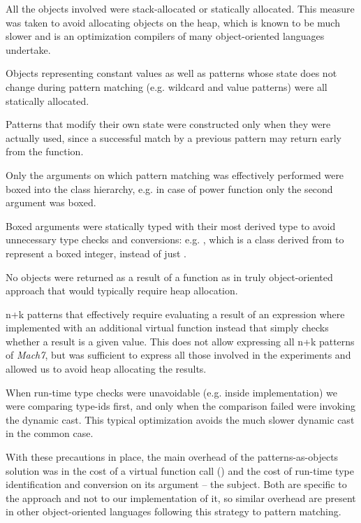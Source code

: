 \begin{compactitem}
\setlength{\itemsep}{0pt}
\setlength{\parskip}{0pt}
\item All the objects involved were stack-allocated or statically allocated. 
      This measure was taken to avoid allocating objects on the heap, which is 
      known to be much slower and is an optimization compilers of many 
      object-oriented languages undertake.
\item Objects representing constant values as well as patterns whose state 
      does not change during pattern matching (e.g. wildcard and value patterns) 
      were all statically allocated.
\item Patterns that modify their own state were constructed only when they were 
      actually used, since a successful match by a previous pattern may return 
      early from the function.
\item Only the arguments on which pattern matching was effectively performed 
      were boxed into the  class hierarchy, e.g. in case of power 
      function only the second argument was boxed.
\item Boxed arguments were statically typed with their most derived type to 
      avoid unnecessary type checks and conversions: e.g. , 
      which is a class derived from  to represent a boxed integer, 
      instead of just .
\item No objects were returned as a result of a function as in truly 
      object-oriented approach that would typically require heap allocation.
\item n+k patterns that effectively require evaluating a result of an expression 
      where implemented with an additional virtual function instead that simply
      checks whether a result is a given value. This does not allow expressing
      all n+k patterns of \emph{Mach7}, but was sufficient to express all those 
      involved in the experiments and allowed us to avoid heap allocating the 
      results. 
\item When run-time type checks were unavoidable (e.g. inside  
      implementation) we were comparing type-ids first, and only when the 
      comparison failed were invoking the dynamic cast. This typical 
      optimization avoids the much slower dynamic cast in the common case.
\end{compactitem}

\noindent
With these precautions in place, the main overhead of the 
patterns-as-objects solution was in the cost of a virtual 
function call () and the cost of run-time type 
identification and conversion on its argument -- the subject. Both are specific 
to the approach and not to our implementation of it, so
similar overhead are present in other object-oriented languages following 
this strategy to pattern matching.

